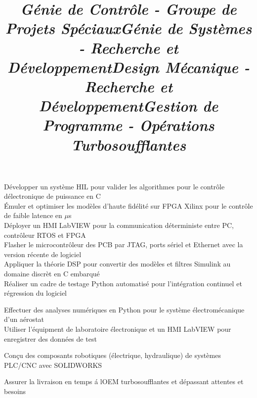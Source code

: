 \documentclass[mm]{res}
\begin{document}
\begin{resume}
\title{\textsl{G\'enie de Contr\^ole - Groupe de Projets Sp\'eciaux}}
\begin{position}
\tb D\'evelopper un syst\`eme HIL pour valider les algorithmes pour le contr\^ole d\textquotesingle \'electronique de puissance en C\\
\tb \'Emuler et optimiser les mod\`eles d'haute fid\'elit\'e sur FPGA Xilinx pour le contr\^ole de faible latence en $\mu$s\\
\tb D\'eployer un HMI LabVIEW pour la communication d\'eterministe entre PC, contr\^oleur RTOS et FPGA\\
\tb Flasher le microcontr\^oleur des PCB par JTAG, ports s\'eriel et Ethernet avec la version r\'ecente de logiciel \\
\tb Appliquer la th\'eorie DSP pour convertir des mod\`eles et filtres Simulink au domaine discr\`et en C embarqu\'e\\
\tb R\'ealiser un cadre de testage Python automatis\'e pour l'int\'egration continuel et r\'egression du logiciel
\end{position}

\title{\textsl{G\'enie de Syst\`emes - Recherche et D\'eveloppement}}
\begin{position}
\tb Effectuer des analyses num\'eriques en Python pour le syst\`eme \'electrom\'ecanique d'un a\'erostat\\
\tb Utiliser l'\'equipment de laboratoire \'electronique et un HMI LabVIEW pour enregistrer des donn\'ees de test
\end{position}

\title{\textsl{Design M\'ecanique - Recherche et D\'eveloppement}}
\begin{position}
\tb Con\c{c}u des composants robotiques (\'electrique, hydraulique) de syst\`emes PLC/CNC avec SOLIDWORKS
\end{position}

\title{\textsl{Gestion de Programme - Op\'erations Turbosoufflantes}}
\begin{position}
\tb Assurer la livraison en temps \'a l\textquotesingle OEM turbosoufflantes et d\'epassant attentes et besoins
\end{position}


\end{resume}
\end{document}
